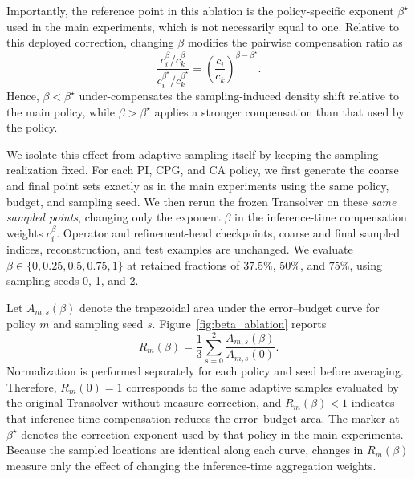 \documentclass{article}
\begin{document}
Importantly, the reference point in this ablation is the
policy-specific exponent $\beta^\star$ used in the main experiments,
which is not necessarily equal to one. Relative to this deployed
correction, changing $\beta$ modifies the pairwise compensation ratio as
\begin{equation}
    \frac{
        c_i^\beta/c_k^\beta
    }{
        c_i^{\beta^\star}/c_k^{\beta^\star}
    }
    =
    \left(
        \frac{c_i}{c_k}
    \right)^{\beta-\beta^\star}.
    \label{eq:beta_mismatch}
\end{equation}
Hence, $\beta<\beta^\star$ under-compensates the sampling-induced density
shift relative to the main policy, while $\beta>\beta^\star$ applies a
stronger compensation than that used by the policy.

We isolate this effect from adaptive sampling itself by keeping the
sampling realization fixed. For each PI, CPG, and CA policy, we first
generate the coarse and final point sets exactly as in the main
experiments using the same policy, budget, and sampling seed. We then
rerun the frozen Transolver on these \emph{same sampled points}, changing
only the exponent $\beta$ in the inference-time compensation weights
$c_i^\beta$. Operator and refinement-head checkpoints, coarse and final
sampled indices, reconstruction, and test examples are unchanged.
We evaluate
$\beta\in\{0,0.25,0.5,0.75,1\}$
at retained fractions of $37.5\%$, $50\%$, and $75\%$, using sampling
seeds 0, 1, and 2.

Let $A_{m,s}(\beta)$ denote the trapezoidal area under the error--budget
curve for policy $m$ and sampling seed $s$. Figure~\ref{fig:beta_ablation}
reports
\begin{equation}
    R_m(\beta)
    =
    \frac{1}{3}
    \sum_{s=0}^{2}
    \frac{A_{m,s}(\beta)}{A_{m,s}(0)}.
    \label{eq:beta_relative_area}
\end{equation}
Normalization is performed separately for each policy and seed before
averaging. Therefore, $R_m(0)=1$ corresponds to the same adaptive
samples evaluated by the original Transolver without measure correction,
and $R_m(\beta)<1$ indicates that inference-time compensation reduces
the error--budget area. The marker at $\beta^\star$ denotes the
correction exponent used by that policy in the main experiments.
Because the sampled locations are identical along each curve, changes in
$R_m(\beta)$ measure only the effect of changing the inference-time
aggregation weights.
\end{document}
